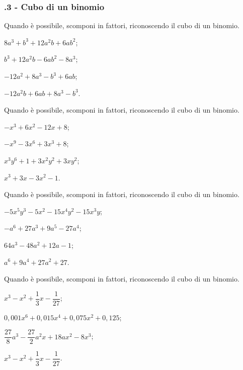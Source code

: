 \subsubsection*{\thechapter.3 - Cubo di un binomio}
\begin{multicols}{2}
\begin{esercizio}
\label{ese:16.20}
Quando è possibile, scomponi in fattori, riconoscendo il cubo di un binomio.
\begin{enumeratea}
 \item $8a^{3}+b^{3}+12a^{2}b+6ab^{2}$;
 \item $b^{3}+12a^{2}b-6ab^{2}-8a^{3}$;
 \item $-12a^{2}+8a^{3}-b^{3}+6ab$;
 \item $-12a^{2}b+6ab+8a^{3}-b^{3}$.
\end{enumeratea}
\end{esercizio}

\begin{esercizio}
\label{ese:16.21}
Quando è possibile, scomponi in fattori, riconoscendo il cubo di un binomio.
\begin{enumeratea}
 \item $-x^{3}+6x^{2}-12x+8$;
 \item $-x^{9}-3x^{6}+3x^{3}+8$;
 \item $x^{3}y^{6}+1+3x^{2}y^{2}+3xy^{2}$;
 \item $x^{3}+3x-3x^{2}-1$.
\end{enumeratea}
\end{esercizio}

\begin{esercizio}
\label{ese:16.22}
Quando è possibile, scomponi in fattori, riconoscendo il cubo di un binomio.
\begin{enumeratea}
 \item $-5x^{5}y^{3}-5x^{2}-15x^{4}y^{2}-15x^{3}y$;
 \item $-a^{6}+27a^{3}+9a^{5}-27a^{4}$;
 \item $64a^{3}-48a^{2}+12a-1$;
 \item $a^{6}+9a^{4}+27a^{2}+27$.
\end{enumeratea}
\end{esercizio}

\begin{esercizio}
\label{ese:16.23}
Quando è possibile, scomponi in fattori, riconoscendo il cubo di un binomio.
\begin{enumeratea}
 \item $x^{3}-x^{2}+\dfrac{1}{3}x-\dfrac{1}{27}$;
 \item $0,001x^{6}+0,015x^{4}+0,075x^{2}+0,125$;
 \item $\dfrac{27}{8}a^{3}-\dfrac{27}{2}a^{2}x+18ax^{2}-8x^{3}$;
 \item $x^{3}-x^{2}+\dfrac{1}{3}x-\dfrac{1}{27}$.
\end{enumeratea}
\end{esercizio}


\end{multicols}
